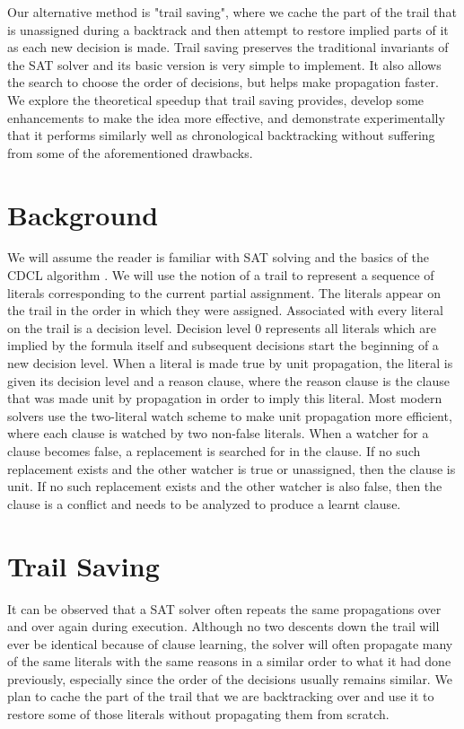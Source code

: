\documentclass{article}
\begin{document}
Our alternative method is "trail saving", where we cache the part of the trail that is unassigned during a backtrack and then attempt to restore implied parts of it as each new decision is made. Trail saving preserves the traditional invariants of the SAT solver and its basic version is very simple to implement. It also allows the search to choose the order of decisions, but helps make propagation faster. We explore the theoretical speedup that trail saving provides, develop some enhancements to make the idea more effective, and demonstrate experimentally that it performs similarly well as chronological backtracking without suffering from some of the aforementioned drawbacks.

\section{Background}
We will assume the reader is familiar with SAT solving and the basics of the CDCL algorithm \cite{DBLP:series/faia/SilvaLM09}. We will use the notion of a trail to represent a sequence of literals corresponding to the current partial assignment. The literals appear on the trail in the order in which they were assigned. Associated with every literal on the trail is a decision level. Decision level 0 represents all literals which are implied by the formula itself and subsequent decisions start the beginning of a new decision level. When a literal is made true by unit propagation, the literal is given its decision level and a reason clause, where the reason clause is the clause that was made unit by propagation in order to imply this literal. Most modern solvers use the two-literal watch scheme to make unit propagation more efficient, where each clause is watched by two non-false literals. When a watcher for a clause becomes false, a replacement is searched for in the clause. If no such replacement exists and the other watcher is true or unassigned, then the clause is unit. If no such replacement exists and the other watcher is also false, then the clause is a conflict and needs to be analyzed to produce a learnt clause.

\section{Trail Saving}
It can be observed that a SAT solver often repeats the same propagations over and over again during execution. Although no two descents down the trail will ever be identical because of clause learning, the solver will often propagate many of the same literals with the same reasons in a similar order to what it had done previously, especially since the order of the decisions usually remains similar. We plan to cache the part of the trail that we are backtracking over and use it to restore some of those literals without propagating them from scratch.
\end{document}
